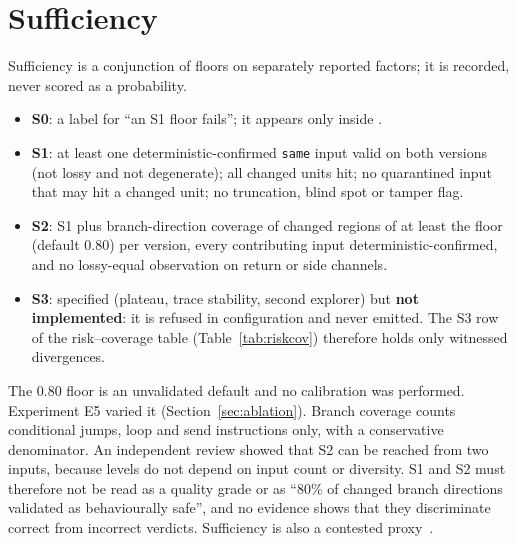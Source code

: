\section{Sufficiency}\label{sec:sufficiency}
Sufficiency is a conjunction of floors on separately reported factors; it is recorded, never scored as a probability.
\begin{itemize}
\item \textbf{S0}: a label for ``an S1 floor fails''; it appears only inside \INS.
\item \textbf{S1}: at least one deterministic-confirmed \texttt{same} input valid on both versions (not lossy and not degenerate); all changed units hit; no quarantined input that may hit a changed unit; no truncation, blind spot or tamper flag.
\item \textbf{S2}: S1 plus branch-direction coverage of changed regions of at least the floor (default 0.80) per version, every contributing input deterministic-confirmed, and no lossy-equal observation on return or side channels.
\item \textbf{S3}: specified (plateau, trace stability, second explorer) but \textbf{not implemented}: it is refused in configuration and never emitted. The S3 row of the risk--coverage table (Table~\ref{tab:riskcov}) therefore holds only witnessed divergences.
\end{itemize}
The 0.80 floor is an unvalidated default and no calibration was performed. Experiment E5 varied it (Section~\ref{sec:ablation}). Branch coverage counts conditional jumps, loop and send instructions only, with a conservative denominator. An independent review showed that S2 can be reached from two inputs, because levels do not depend on input count or diversity. S1 and S2 must therefore not be read as a quality grade or as ``80\% of changed branch directions validated as behaviourally safe'', and no evidence shows that they discriminate correct from incorrect verdicts. Sufficiency is also a contested proxy~\cite{inozemtseva2014coverage,just2014mut}.
